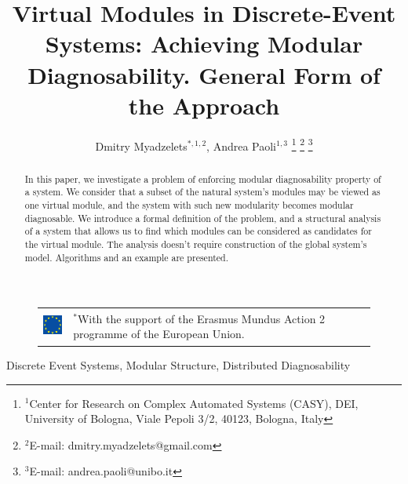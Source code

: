 \documentclass[a4paper, 10pt, conference]{ieeeconf}
\begin{document}
\title{Virtual Modules in Discrete-Event Systems: 
Achieving Modular Diagnosability. General Form of the Approach}
\author{
	Dmitry Myadzelets$^{*,1,2}$, Andrea Paoli$^{1,3}$
	\thanks{$^{1}$Center for Research on Complex Automated Systems (CASY), DEI,
	University of Bologna, Viale Pepoli 3/2, 40123, Bologna, Italy}
		\thanks{$^{2}$E-mail: {dmitry.myadzelets@gmail.com}}
		\thanks{$^{3}$E-mail: {andrea.paoli@unibo.it}}
}
\maketitle

\begin{figure}[!b]
\begin{tabular}{l p{60mm}}
 	\includegraphics[height=10mm]{EU_flag.eps}
 	& \vspace{-10mm} \footnotesize
 	$^{*}$With the support of the Erasmus Mundus Action 2 programme of the
 	European Union.
\end{tabular}
\end{figure}

\begin{abstract} In this paper, we investigate a problem of enforcing modular
diagnosability property of a system. We consider that a subset of the natural
system's modules may be viewed as one virtual module, and the system with such
new modularity becomes modular diagnosable. We introduce a formal definition of
the problem, and a structural analysis of a system that allows us to find which
modules can be considered as candidates for the virtual module. The analysis
doesn't require construction of the global system's model. Algorithms and an
example are presented.
\end{abstract}

\begin{keywords}
Discrete Event Systems, Modular Structure, Distributed Diagnosability
\end{keywords}

\newtheorem{theorem}{Theorem}
\newtheorem{definition}{Definition}
\newtheorem{lemma}{Lemma}
\newtheorem{assumption}{Assumption}
\newtheorem{corollary}{Corollary}
\newtheorem{example}{Example}
\end{document}
